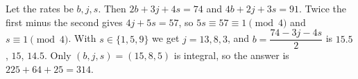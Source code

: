 Let the rates be $b,j,s$. Then $2b+3j+4s=74$ and $4b+2j+3s=91$. Twice the first minus the second gives $4j+5s=57$, so $5s\equiv57\equiv1\pmod4$ and $s\equiv1\pmod4$. With $s\in\{1,5,9\}$ we get $j=13,8,3$, and $b=\dfrac{74-3j-4s}{2}$ is $15.5$, $15$, $14.5$. Only $(b,j,s)=(15,8,5)$ is integral, so the answer is $225+64+25=\boxed{314}$.
